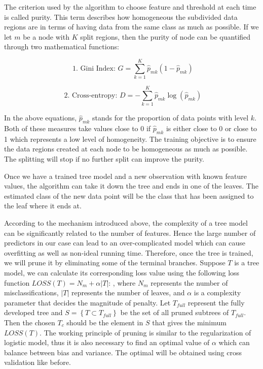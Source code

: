 \documentclass[preprint, 3p,
authoryear]{elsarticle} %
\begin{document}
The criterion used by the algorithm to choose feature and threshold at
each time is called purity. This term describes how homogeneous the
subdivided data regions are in terms of having data from the same class
as much as possible. If we let \(m\) be a node with \(K\) split regions,
then the purity of node can be quantified through two mathematical
functions:

\[
\text { 1. Gini Index: } G=\sum_{k=1}^{K} \hat{p}_{m k}\left(1-\hat{p}_{m k}\right)
\]

\[
\text { 2. Cross-entropy: } D=-\sum_{k=1}^{K} \hat{p}_{m k} \log \left(\hat{p}_{m k}\right)
\]

In the above equations, \(\hat{p}_{mk}\) stands for the proportion of
data points with level \(k\). Both of these measures take values close
to 0 if \(\hat{p}_{mk}\) is either close to 0 or close to 1 which
represents a low level of homogeneity. The training objective is to
ensure the data regions created at each node to be homogeneous as much
as possible. The splitting will stop if no further split can improve the
purity.

Once we have a trained tree model and a new observation with known
feature values, the algorithm can take it down the tree and ends in one
of the leaves. The estimated class of the new data point will be the
class that has been assigned to the leaf where it ends at.

According to the mechanism introduced above, the complexity of a tree
model can be significantly related to the number of features. Hence the
large number of predictors in our case can lead to an over-complicated
model which can cause overfitting as well as non-ideal running time.
Therefore, once the tree is trained, we will prune it by eliminating
some of the terminal branches. Suppose \(T\) is a tree model, we can
calculate its corresponding loss value using the following loss function
\(LOSS(T)=N_{m}+\alpha|T|\): , where \(N_m\) represents the number of
misclassifications, \(|T|\) represents the number of leaves, and
\(\alpha\) is a complexity parameter that decides the magnitude of
penalty. Let \(T_{full}\) represent the fully developed tree and
\(S=\left\{T \subset T_{f u l l}\right\}\) be the set of all pruned
subtrees of \(T_{full}\). Then the chosen \(T_c\) should be the element
in \(S\) that gives the minimum \(LOSS(T)\). The working principle of
pruning is similar to the regularization of logistic model, thus it is
also necessary to find an optimal value of \(\alpha\) which can balance
between bias and variance. The optimal will be obtained using cross
validation like before.
\end{document}
